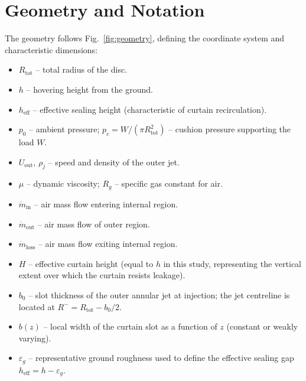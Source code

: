 \documentclass[11pt,a4paper]{article}
\begin{document}
\section{Geometry and Notation}
\label{sec:geometry}
The geometry follows Fig.~\ref{fig:geometry}, defining the coordinate system and characteristic dimensions:
\begin{itemize}
  \item $R_{\mathrm{tot}}$ -- total radius of the disc.
  \item $h$ -- hovering height from the ground.
  \item $h_{\mathrm{eff}}$ -- effective sealing height (characteristic of curtain recirculation).
  \item $p_0$ -- ambient pressure; $p_c=W/(\pi R_{\mathrm{tot}}^2)$ -- cushion pressure supporting the load $W$.
  \item $U_{\mathrm{out}}$, $\rho_j$ -- speed and density of the outer jet.
  \item $\mu$ -- dynamic viscosity; $R_g$ -- specific gas constant for air.
  \item $\dot{m}_{\mathrm{in}}$ -- air mass flow entering internal region.
  \item $\dot{m}_{\mathrm{out}}$ -- air mass flow of outer region.
  \item $\dot{m}_{\mathrm{loss}}$ -- air mass flow exiting internal region.
  \item $H$ -- effective curtain height (equal to $h$ in this study, representing the vertical extent over which the curtain resists leakage).
  \item $b_0$ -- slot thickness of the outer annular jet at injection; the jet centreline is located at $R^{-}=R_{\mathrm{tot}}-b_0/2$.
  \item $b(z)$ -- local width of the curtain slot as a function of $z$ (constant or weakly varying).
  \item $\varepsilon_g$ -- representative ground roughness used to define the effective sealing gap $h_{\mathrm{eff}} = h - \varepsilon_g$.
\end{itemize}
\end{document}
